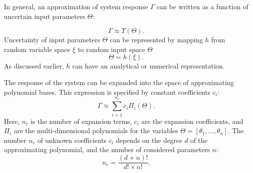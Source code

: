 In general, an approximation of system response $\Gamma$ can be written as a
function of uncertain input parameters $\Theta$:

\begin{equation}
  \Gamma\approx\Upsilon(\Theta).
  \label{eq:1}
\end{equation} 
%
Uncertainty of input parameters $\Theta$ can be represented by mapping $h$ from
random variable space $\xi$ to random input space $\Theta$%
\begin{equation}
  \Theta=h(\xi).
  \label{eq:rand}
\end{equation} As discussed earlier, $h$ can have an analytical or numerical
representation.



The response of the system can be expanded into the
space of approximating polynomial bases. This expression is specified by constant coefficients $c_i$:
%
\begin{equation}
\Gamma\approx\underset{i=1}{\overset{n_c}{\sum}}c_{i}\Pi_{i}(\Theta).
  \label{eq:exp}
\end{equation} Here, $n_c$ is the number of expansion terms, $c_{i}$ are the
expansion coefficients, and
$\Pi_{i}$ are the multi-dimensional polynomials for the variables
$\Theta=[\theta_{1},...,\theta_{n}]$. The number $n_c$ of unknown
coefficients $c_{i}$ depends on the degree $d$ of the approximating polynomial,
and the number of considered parameters $n$:
%
\begin{equation}
 n_c=\frac{(d+n)!}{d!\times n!}.
 \label{eq:np}
\end{equation}
%

